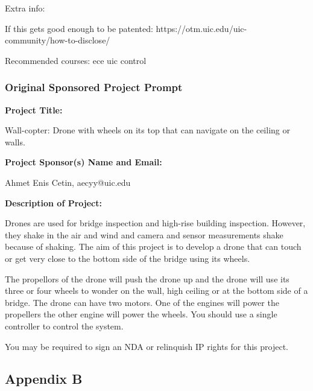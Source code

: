 \documentclass[12pt]{article}
\begin{document}
                \noindent Extra info:

                If this gets good enough to be patented: https://otm.uic.edu/uic-community/how-to-disclose/

                Recommended courses: ece uic control
            
            \subsubsection{Original Sponsored Project Prompt}

                \noindent\textbf{\large Project Title:}

                Wall-copter: Drone with wheels on its top that can navigate on the ceiling or walls.

                \noindent\textbf{\large Project Sponsor(s) Name and Email:}

                Ahmet Enis Cetin, aecyy@uic.edu

                \noindent\textbf{\large Description of Project:}

                Drones are used for bridge inspection and high-rise building inspection.
                However, they shake in the air and wind and camera and sensor measurements shake because of shaking.
                The aim of this project is to develop a drone that can touch or get very close to the bottom side of the bridge using its wheels.

                The propellors of the drone will push the drone up and the drone will use its three or four wheels to wonder on the wall, high ceiling or at the bottom side of a bridge.
                The drone can have two motors.
                One of the engines will power the propellers the other engine will power the wheels.
                You should use a single controller to control the system.

                You may be required to sign an NDA or relinquish IP rights for this project.
        
        \newpage
        \subsection{Appendix B}
            \newcommand{\ieeestd}[3]{
                \noindent\textbf{#1} \\
                \noindent\url{#2} \\
                \noindent#3 \\
                \vspace{0.5cm}

            }
\end{document}

